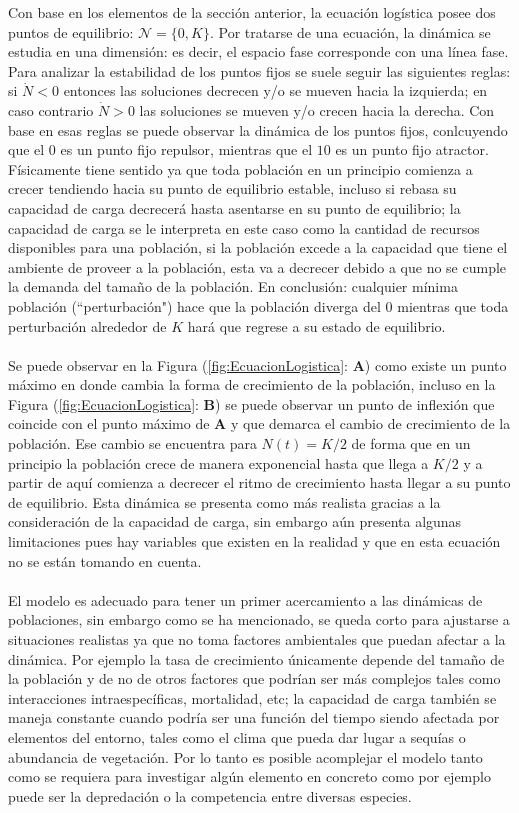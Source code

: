 Con base en los elementos de la sección anterior, la ecuación logística posee dos puntos de equilibrio: $\mathcal{N}=\{0,K\}$. Por tratarse de una ecuación, la dinámica se estudia en una dimensión: es decir, el espacio fase corresponde con una línea fase. Para analizar la estabilidad de los puntos fijos se suele seguir las siguientes reglas: si $\dot{N}<0$ entonces las soluciones decrecen y/o se mueven hacia la izquierda; en caso contrario $\dot{N}>0$ las soluciones se mueven y/o crecen hacia la derecha. Con base en esas reglas se puede observar la dinámica de los puntos fijos, conlcuyendo que el $0$ es un punto fijo repulsor, mientras que el $10$ es un punto fijo atractor. Físicamente tiene sentido ya que toda población en un principio comienza a crecer tendiendo hacia su punto de equilibrio estable, incluso si rebasa su capacidad de carga decrecerá hasta asentarse en su punto de equilibrio; la capacidad de carga se le interpreta en este caso como la cantidad de recursos disponibles para una población, si la población excede a la capacidad que tiene el ambiente de proveer a la población, esta va a decrecer debido a que no se cumple la demanda del tamaño de la población. En conclusión: cualquier mínima población (``perturbación") hace que la población diverga del 0 mientras que toda perturbación alrededor de $K$ hará que regrese a su estado de equilibrio.\\
\\
Se puede observar en la Figura (\ref{fig:EcuacionLogistica}: \textbf{A}) como existe un punto máximo en donde cambia la forma de crecimiento de la población, incluso en la Figura (\ref{fig:EcuacionLogistica}: \textbf{B}) se puede observar un punto de inflexión que coincide con el punto máximo de \textbf{A} y que demarca el cambio de crecimiento de la población. Ese cambio se encuentra para $N(t)=K/2$ de forma que en un principio la población crece de manera exponencial hasta que llega a $K/2$ y a partir de aquí comienza a decrecer el ritmo de crecimiento hasta llegar a su punto de equilibrio. Esta dinámica se presenta como más realista gracias a la consideración de la capacidad de carga, sin embargo aún presenta algunas limitaciones pues hay variables que existen en la realidad y que en esta ecuación no se están tomando en cuenta.\\
\\
El modelo es adecuado para tener un primer acercamiento a las dinámicas de poblaciones, sin embargo como se ha mencionado, se queda corto para ajustarse a situaciones realistas ya que no toma factores ambientales que puedan afectar a la dinámica. Por ejemplo la tasa de crecimiento únicamente depende del tamaño de la población y de no de otros factores que podrían ser más complejos tales como interacciones intraespecíficas, mortalidad, etc; la capacidad de carga también se maneja constante cuando podría ser una función del tiempo siendo afectada por elementos del entorno, tales como el clima que pueda dar lugar a sequías o abundancia de vegetación. Por lo tanto es posible acomplejar el modelo tanto como se requiera para investigar algún elemento en concreto como por ejemplo puede ser la depredación o la competencia entre diversas especies.
